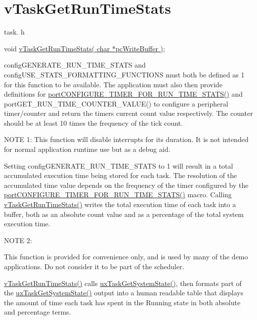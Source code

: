 \hypertarget{group__vTaskGetRunTimeStats}{}\section{v\+Task\+Get\+Run\+Time\+Stats}
\label{group__vTaskGetRunTimeStats}
task. h 
\begin{DoxyPre}void \hyperlink{task_8h_a52da9b427041a48dc9f6802e10f151d4}{vTaskGetRunTimeStats( char *pcWriteBuffer )};\end{DoxyPre}


config\+G\+E\+N\+E\+R\+A\+T\+E\+\_\+\+R\+U\+N\+\_\+\+T\+I\+M\+E\+\_\+\+S\+T\+A\+TS and config\+U\+S\+E\+\_\+\+S\+T\+A\+T\+S\+\_\+\+F\+O\+R\+M\+A\+T\+T\+I\+N\+G\+\_\+\+F\+U\+N\+C\+T\+I\+O\+NS must both be defined as 1 for this function to be available. The application must also then provide definitions for \hyperlink{FreeRTOS_8h_a727939bcdb98501e0eba0ec8a1841e1b}{port\+C\+O\+N\+F\+I\+G\+U\+R\+E\+\_\+\+T\+I\+M\+E\+R\+\_\+\+F\+O\+R\+\_\+\+R\+U\+N\+\_\+\+T\+I\+M\+E\+\_\+\+S\+T\+A\+T\+S()} and port\+G\+E\+T\+\_\+\+R\+U\+N\+\_\+\+T\+I\+M\+E\+\_\+\+C\+O\+U\+N\+T\+E\+R\+\_\+\+V\+A\+L\+U\+E() to configure a peripheral timer/counter and return the timers current count value respectively. The counter should be at least 10 times the frequency of the tick count.

N\+O\+TE 1\+: This function will disable interrupts for its duration. It is not intended for normal application runtime use but as a debug aid.

Setting config\+G\+E\+N\+E\+R\+A\+T\+E\+\_\+\+R\+U\+N\+\_\+\+T\+I\+M\+E\+\_\+\+S\+T\+A\+TS to 1 will result in a total accumulated execution time being stored for each task. The resolution of the accumulated time value depends on the frequency of the timer configured by the \hyperlink{FreeRTOS_8h_a727939bcdb98501e0eba0ec8a1841e1b}{port\+C\+O\+N\+F\+I\+G\+U\+R\+E\+\_\+\+T\+I\+M\+E\+R\+\_\+\+F\+O\+R\+\_\+\+R\+U\+N\+\_\+\+T\+I\+M\+E\+\_\+\+S\+T\+A\+T\+S()} macro. Calling \hyperlink{task_8h_a52da9b427041a48dc9f6802e10f151d4}{v\+Task\+Get\+Run\+Time\+Stats()} writes the total execution time of each task into a buffer, both as an absolute count value and as a percentage of the total system execution time.

N\+O\+TE 2\+:

This function is provided for convenience only, and is used by many of the demo applications. Do not consider it to be part of the scheduler.

\hyperlink{task_8h_a52da9b427041a48dc9f6802e10f151d4}{v\+Task\+Get\+Run\+Time\+Stats()} calls \hyperlink{task_8h_aa4603f3de3d809e9beb18d10fbac005d}{ux\+Task\+Get\+System\+State()}, then formats part of the \hyperlink{task_8h_aa4603f3de3d809e9beb18d10fbac005d}{ux\+Task\+Get\+System\+State()} output into a human readable table that displays the amount of time each task has spent in the Running state in both absolute and percentage terms.


